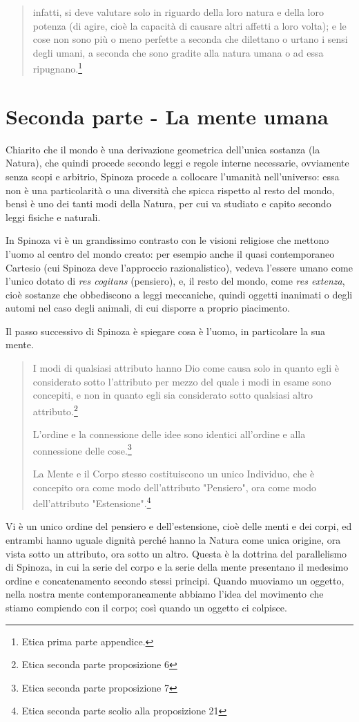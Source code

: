 \begin{quotation}
	infatti, si deve valutare solo in riguardo della loro natura e della loro potenza (di agire, cioè la capacità  di causare altri affetti a loro volta); e le cose non
	sono più o meno perfette a seconda che dilettano o urtano i sensi degli umani, a seconda
	che sono gradite alla natura umana o ad essa ripugnano.\footnote{Etica prima parte appendice.}
	
\end{quotation}
\newpage
\section[La mente umana]{Seconda parte - La mente umana}
Chiarito che il mondo è una derivazione geometrica dell'unica sostanza (la Natura), che quindi procede secondo leggi e regole interne necessarie, ovviamente senza scopi e arbitrio, Spinoza procede a collocare l'umanità nell'universo: essa non è una particolarità o una diversità che spicca rispetto al resto del mondo, bensì è uno dei tanti modi della Natura, per cui va studiato e capito secondo leggi fisiche e naturali.

In Spinoza vi è un grandissimo contrasto con le visioni religiose che mettono l'uomo al centro del mondo creato: per esempio anche il quasi contemporaneo Cartesio (cui Spinoza deve l'approccio razionalistico), vedeva l'essere umano come l'unico dotato di \textit{res cogitans} (pensiero), e, il resto del mondo, come \textit{res extenza}, cioè sostanze che obbediscono a leggi meccaniche, quindi oggetti inanimati o degli automi nel caso degli animali, di cui disporre a proprio piacimento.

Il passo successivo di Spinoza è spiegare cosa è l'uomo, in particolare la sua mente.

\begin{quotation}
	\small I modi di qualsiasi attributo hanno Dio come causa solo in quanto egli è considerato sotto l’attributo per mezzo del quale i modi in esame sono concepiti, e non in quanto egli sia considerato sotto qualsiasi altro attributo.\footnote{Etica seconda parte proposizione 6}
	
	\small L’ordine e la connessione delle idee sono identici all’ordine e alla connessione delle cose.\footnote{Etica seconda parte proposizione 7}
	
	\small La Mente e il Corpo stesso costituiscono un unico Individuo,
	che è concepito ora come modo dell’attributo "Pensiero", ora come modo dell’attributo "Estensione".\footnote{Etica seconda parte scolio alla proposizione 21}
	
\end{quotation}
Vi è un unico ordine del pensiero e dell'estensione, cioè delle menti e dei corpi, ed entrambi hanno uguale dignità perché hanno la Natura come unica origine, ora vista sotto un attributo, ora sotto un altro. Questa è la dottrina del parallelismo di Spinoza, in cui la serie del corpo e la serie della mente presentano il medesimo ordine e concatenamento secondo stessi principi. Quando muoviamo un oggetto, nella nostra mente contemporaneamente abbiamo l'idea del movimento che stiamo compiendo con il corpo; così quando un oggetto ci colpisce.

